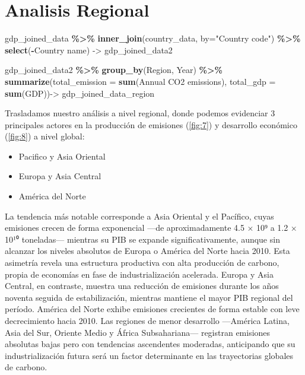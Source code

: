 \documentclass[
]{book}
\newenvironment{Shaded}{\begin{snugshade}}{\end{snugshade}}
\newcommand{\AttributeTok}[1]{\textcolor[rgb]{0.13,0.29,0.53}{#1}}
\newcommand{\FunctionTok}[1]{\textcolor[rgb]{0.13,0.29,0.53}{\textbf{#1}}}
\newcommand{\NormalTok}[1]{#1}
\newcommand{\OtherTok}[1]{\textcolor[rgb]{0.56,0.35,0.01}{#1}}
\newcommand{\SpecialCharTok}[1]{\textcolor[rgb]{0.81,0.36,0.00}{\textbf{#1}}}
\newcommand{\StringTok}[1]{\textcolor[rgb]{0.31,0.60,0.02}{#1}}
\providecommand{\tightlist}{%
  \setlength{\itemsep}{0pt}\setlength{\parskip}{0pt}}
\begin{document}
\section{Analisis Regional}\label{analisis-regional}

\begin{Shaded}
\begin{Highlighting}[]
\NormalTok{gdp\_joined\_data }\SpecialCharTok{\%\textgreater{}\%} 
  \FunctionTok{inner\_join}\NormalTok{(country\_data, }\AttributeTok{by=}\StringTok{"Country code"}\NormalTok{) }\SpecialCharTok{\%\textgreater{}\%} 
  \FunctionTok{select}\NormalTok{(}\SpecialCharTok{{-}}\StringTok{\textasciigrave{}}\AttributeTok{Country name}\StringTok{\textasciigrave{}}\NormalTok{) }\OtherTok{{-}\textgreater{}}\NormalTok{ gdp\_joined\_data2}
  
\NormalTok{gdp\_joined\_data2 }\SpecialCharTok{\%\textgreater{}\%} 
  \FunctionTok{group\_by}\NormalTok{(Region, Year) }\SpecialCharTok{\%\textgreater{}\%} 
  \FunctionTok{summarize}\NormalTok{(}\AttributeTok{total\_emission =} \FunctionTok{sum}\NormalTok{(}\StringTok{\textasciigrave{}}\AttributeTok{Annual CO2 emissions}\StringTok{\textasciigrave{}}\NormalTok{), }\AttributeTok{total\_gdp =} \FunctionTok{sum}\NormalTok{(GDP))}\OtherTok{{-}\textgreater{}}\NormalTok{ gdp\_joined\_data\_region}
\end{Highlighting}
\end{Shaded}

Trasladamos nuestro análisis a nivel regional, donde podemos evidenciar 3 principales actores en la producción de emisiones (\ref{fig:7}) y desarrollo económico (\ref{fig:8}) a nivel global:

\begin{itemize}
\tightlist
\item
  Pacifico y Asia Oriental
\item
  Europa y Asia Central
\item
  América del Norte
\end{itemize}

La tendencia más notable corresponde a Asia Oriental y el Pacífico, cuyas emisiones crecen de forma exponencial ---de aproximadamente 4.5 × 10⁹ a 1.2 × 10¹⁰ toneladas--- mientras su PIB se expande significativamente, aunque sin alcanzar los niveles absolutos de Europa o América del Norte hacia 2010. Esta asimetría revela una estructura productiva con alta producción de carbono, propia de economías en fase de industrialización acelerada. Europa y Asia Central, en contraste, muestra una reducción de emisiones durante los años noventa seguida de estabilización, mientras mantiene el mayor PIB regional del período. América del Norte exhibe emisiones crecientes de forma estable con leve decrecimiento hacia 2010. Las regiones de menor desarrollo ---América Latina, Asia del Sur, Oriente Medio y África Subsahariana--- registran emisiones absolutas bajas pero con tendencias ascendentes moderadas, anticipando que su industrialización futura será un factor determinante en las trayectorias globales de carbono.
\end{document}
